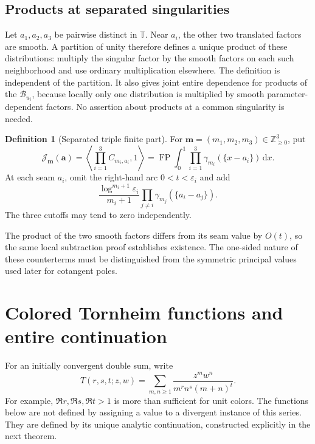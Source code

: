 \documentclass[11pt]{article}
\numberwithin{equation}{section}
\theoremstyle{definition}\newtheorem{definition}[theorem]{Definition}
\theoremstyle{remark}\newtheorem{remark}[theorem]{Remark}
\DeclareMathOperator{\FP}{FP}
\newcommand{\dd}{\,\mathrm d}
\newcommand{\TT}{\mathbb T}
\newcommand{\ZZ}{\mathbb Z}
\newcommand{\calB}{\mathcal B}
\newcommand{\calJ}{\mathcal J}
\begin{document}
\subsection{Products at separated singularities}
Let $a_1,a_2,a_3$ be pairwise distinct in $\TT$. Near $a_i$, the other two
translated factors are smooth. A partition of unity therefore defines a
unique product of these distributions: multiply the singular factor by the
smooth factors on each such neighborhood and use ordinary multiplication
elsewhere. The definition is independent of the partition. It also gives
joint entire dependence for products of the $\calB_{u_i}$, because locally
only one distribution is multiplied by smooth parameter-dependent factors.
No assertion about products at a common singularity is needed.

\begin{definition}[Separated triple finite part]\label{tsc:Jdef}
For $\mathbf m=(m_1,m_2,m_3)\in\ZZ_{\ge0}^3$, put
\begin{equation}\label{tsc:J}
 \calJ_{\mathbf m}(\mathbf a)=
  \left\langle\prod_{i=1}^3 C_{m_i,a_i},1\right\rangle
  =\FP\int_0^1\prod_{i=1}^3
       \gamma_{m_i}(\{x-a_i\})\dd x.
\end{equation}
At each seam $a_i$, omit the right-hand arc $0<t<\varepsilon_i$ and add
\begin{equation}\label{tsc:triple-counterterm}
 \frac{\log^{m_i+1}\varepsilon_i}{m_i+1}
       \prod_{j\ne i}\gamma_{m_j}(\{a_i-a_j\}).
\end{equation}
The three cutoffs may tend to zero independently.
\end{definition}
The product of the two smooth factors differs from its seam value by
$O(t)$, so the same local subtraction proof establishes existence. The
one-sided nature of these counterterms must be distinguished from the
symmetric principal values used later for cotangent poles.


\section{Colored Tornheim functions and entire continuation}\label{tsc:tornheim}
For an initially convergent double sum, write
\begin{equation}\label{tsc:Tdef}
 T(r,s,t;z,w)=\sum_{m,n\ge1}
           \frac{z^m w^n}{m^r n^s(m+n)^t}.
\end{equation}
For example, $\Re r,\Re s,\Re t>1$ is more than sufficient for unit
colors. The functions below are not defined by assigning a value to a
divergent instance of this series. They are defined by its unique analytic
continuation, constructed explicitly in the next theorem.
\end{document}
